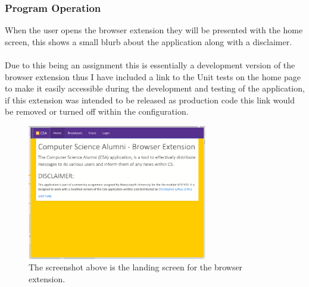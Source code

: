 \documentclass{article}
\begin{document}

\newpage
\subsubsection{Program Operation}

When the user opens the browser extension they will be presented with the home screen, this shows a small blurb about the application along with a disclaimer.\\
\\
Due to this being an assignment this is essentially a development version of the browser extension thus I have included a link to the Unit tests on the home page to make it easily accessible during the development and testing of the application, if this extension was intended to be released as production code this link would be removed or turned off within the configuration.\\

\begin{figure}[H]
\centering
\includegraphics[width=0.7\textwidth]{homepage}
\caption{The screenshot above is the landing screen for the browser extension.}
\end{figure}
\end{document}
